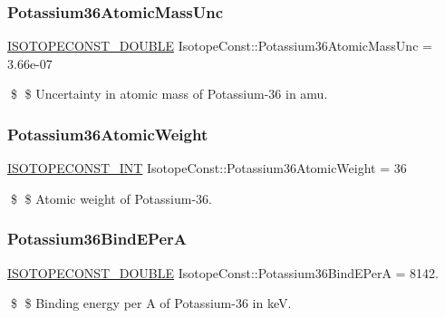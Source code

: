 \subsubsection{\texorpdfstring{Potassium36\+Atomic\+Mass\+Unc}{Potassium36AtomicMassUnc}}
{\footnotesize\ttfamily \mbox{\hyperlink{group___isotope_const-_macros_ga8f45a7272ce02c0b4c65c44636ed719a}{I\+S\+O\+T\+O\+P\+E\+C\+O\+N\+S\+T\+\_\+\+D\+O\+U\+B\+LE}} Isotope\+Const\+::\+Potassium36\+Atomic\+Mass\+Unc = 3.\+66e-\/07}

\$ \$ Uncertainty in atomic mass of Potassium-\/36 in amu. \mbox{\label{group___isotope_const-_potassium-_k36_ga09d084d5bf6ed1d031b5ac6755a612f7}} 
\subsubsection{\texorpdfstring{Potassium36\+Atomic\+Weight}{Potassium36AtomicWeight}}
{\footnotesize\ttfamily \mbox{\hyperlink{group___isotope_const-_macros_ga5f18360b3e99483a35c32d789e62621c}{I\+S\+O\+T\+O\+P\+E\+C\+O\+N\+S\+T\+\_\+\+I\+NT}} Isotope\+Const\+::\+Potassium36\+Atomic\+Weight = 36}

\$ \$ Atomic weight of Potassium-\/36. \mbox{\label{group___isotope_const-_potassium-_k36_ga515b6c57b3488eaf734772552cd44711}} 
\subsubsection{\texorpdfstring{Potassium36\+Bind\+E\+PerA}{Potassium36BindEPerA}}
{\footnotesize\ttfamily \mbox{\hyperlink{group___isotope_const-_macros_ga8f45a7272ce02c0b4c65c44636ed719a}{I\+S\+O\+T\+O\+P\+E\+C\+O\+N\+S\+T\+\_\+\+D\+O\+U\+B\+LE}} Isotope\+Const\+::\+Potassium36\+Bind\+E\+PerA = 8142.}

\$ \$ Binding energy per A of Potassium-\/36 in keV. \mbox{\label{group___isotope_const-_potassium-_k36_gab638d3f937f1f28f3a0d4c95a639d8c8}} 
